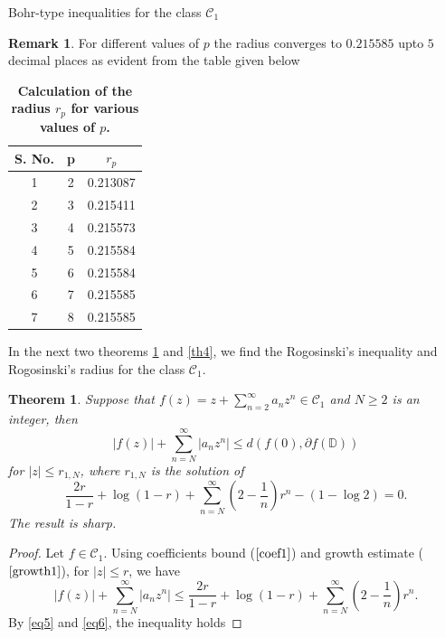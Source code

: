 \documentclass[12pt,a4paper,reqno]{amsart}
\theoremstyle{definition}
\newtheorem{remark}[definition]{Remark}
\theoremstyle{plain}
\newtheorem{theorem}[definition]{Theorem}
\numberwithin{equation}{section}
\begin{document}
\begin{section}{Bohr-type inequalities for the class $\mathcal{C}_1$}
\begin{remark}
For different values of $p$ the radius converges to $0.215585$ upto $5$ decimal places as evident from the table given below
\end{remark}
\begin{table}[h!]
	\begin{center}
		\begin{tabular}{ |c|c|c| }
			\hline
			S. No. & p & $r_p$\\
			\hline
			1 & 2 & 0.213087\\
			\hline
			2 & 3 & 0.215411 \\
			\hline
			3 & 4 & 0.215573\\
			\hline
			4 & 5 & 0.215584\\
			\hline
			5 & 6& 0.215584\\
			\hline
			6 & 7& 0.215585\\
			\hline
			7& 8& 0.215585\\
			\hline
		\end{tabular}
		\caption{\textbf{Calculation of the  radius $r_p$ for various values of $p$.}}
		\label{Table:1}
	\end{center}
\end{table}
\noindent
In the  next two theorems \ref{th3} and \ref{th4}, we find the  Rogosinski's inequality and Rogosinski's radius for the class $\mathcal{C}_1$.
\begin{theorem}\label{th3}
Suppose that $f(z)=z + \sum_{n=2}^{\infty} a_n z^n \in \mathcal{C}_1$ and $N\geq2$ is an integer, then
\begin{equation} \label{2.1.3}
|f(z)|+ \sum_{n=N}^{\infty} |a_n z^n|  \le d(f(0), \partial{f(\mathbb{D})})
\end{equation}
for $|z| \le r_{1,N}$, where $r_{1,N}$ is the solution of
\begin{equation*}
\frac{2r}{1-r} +\log(1-r) + \sum_{n=N}^{\infty} \left( 2-\frac{1}{n} \right) r^{n}- (1 - \log{2})=0.
\end{equation*}
The result is sharp.
\end{theorem}
\begin{proof} Let $f\in  \mathcal{C}_1$. Using
  coefficients bound  ($\ref{coef1}$) and growth estimate ($\ref{growth1}$), for $|z| \le r$, we have
\begin{equation}\label{eq6}
|f(z)|+ \sum_{n=N}^{\infty} |a_n z^n|  \le
\frac{2r}{1-r} +\log(1-r) + \sum_{n=N}^{\infty} \left( 2-\frac{1}{n} \right) r^{n}.
\end{equation}
By \eqref{eq5} and \eqref{eq6}, the  inequality  holds

\end{proof}
\end{section}
\end{document}
